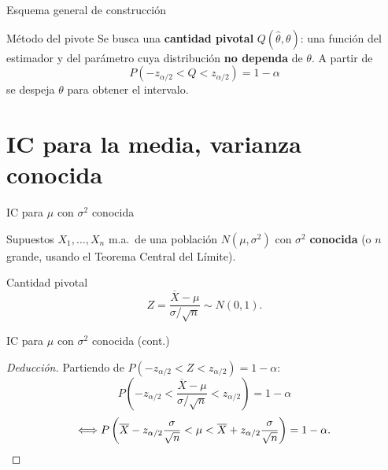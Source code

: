 \documentclass[aspectratio=169,11pt]{beamer}
\begin{document}
\begin{frame}{Esquema general de construcción}
\begin{block}{Método del pivote}
Se busca una \textbf{cantidad pivotal} $Q(\widehat\theta,\theta)$: una función del estimador y del parámetro cuya distribución \textbf{no dependa} de $\theta$. A partir de
\[
P(-z_{\alpha/2} < Q < z_{\alpha/2}) = 1-\alpha
\]
se despeja $\theta$ para obtener el intervalo.
\end{block}
\begin{center}
\end{center}
\end{frame}

\section{IC para la media, varianza conocida}

\begin{frame}{IC para $\mu$ con $\sigma^2$ conocida}
\begin{block}{Supuestos}
$X_1,\dots,X_n$ m.a.\ de una población $N(\mu,\sigma^2)$ con $\sigma^2$ \textbf{conocida} (o $n$ grande, usando el Teorema Central del Límite).
\end{block}

\begin{block}{Cantidad pivotal}
\[
Z = \frac{\overline X - \mu}{\sigma/\sqrt n} \sim N(0,1).
\]
\end{block}

\end{frame}

\begin{frame}{IC para $\mu$ con $\sigma^2$ conocida (cont.)}
\begin{proof}[Deducción]
Partiendo de $P(-z_{\alpha/2} < Z < z_{\alpha/2}) = 1-\alpha$:
\[
P\left(-z_{\alpha/2} < \frac{\overline X-\mu}{\sigma/\sqrt n} < z_{\alpha/2}\right) = 1-\alpha
\]
\[
\Longleftrightarrow P\left(\overline X - z_{\alpha/2}\frac{\sigma}{\sqrt n} < \mu < \overline X + z_{\alpha/2}\frac{\sigma}{\sqrt n}\right) = 1-\alpha. \qedhere
\]
\end{proof}
\end{frame}
\end{document}
